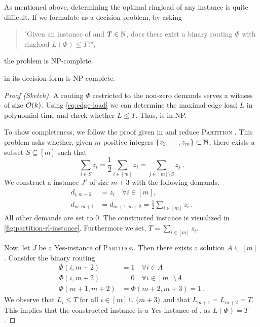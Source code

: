 As mentioned above, determining the optimal ringload of any \RL instance is quite difficult.
If we formulate \RL as a decision problem, by asking
\begin{quote}
	"Given an instance of \RL and $T \in \mathbb{N}$, does there exist a binary routing $\Phi$ with ringload $L(\Phi) \leq T$?",
\end{quote}
the problem is NP-complete.
\begin{theorem}
	\RL in its decision form is NP-complete.
\end{theorem}
\begin{proof}[Proof (Sketch)]
	A routing $\Phi$ restricted to the non-zero demands serves a witness of size $\mathcal{O}(k)$.
	Using \cref{eq:edge-load} we can determine the maximal edge load $L$ in polynomial time and check whether $L \leq T$.
	Thus, \RL is in NP.
	
	To show completeness, we follow the proof given in \cite{schrijver99} and reduce \textsc{Partition} \cite{karp72}.
	This problem asks whether, given $m$ positive integers $\{z_1, \ldots, z_m\} \subset \mathbb{N}$, there exists a subset $S \subseteq [m]$ such that 
	\begin{equation}
		\sum_{i \in S} z_i = \frac{1}{2}  \sum_{i \in [m]} z_i = \sum_{j \in [m] \setminus S} z_j\ .
	\end{equation}
	We construct a \RL instance $J'$ of size $m + 3$ with the following demands:
	\begin{align}
			d_{i, m+2} &= z_i \quad \forall i \in [m], \\
			d_{m, m+1} &= d_{m+1, m+2} = \frac{1}{2}  \sum_{i \in [m]} z_i \ . 
	\end{align}
	All other demands are set to $0$.
	The constructed instance is visualized in \cref{fig:partition-rl-instance}.
	Furthermore we set, $T = \sum_{i \in [m]} z_i$.
	
	Now, let $J$ be a Yes-instance of \textsc{Partition}.
	Then there exists a solution $A \subseteq [m]$.
	Consider the binary routing
	\begin{align}
		\Phi(i, m+2) &= 1 \quad \forall i \in A \\
		\Phi(i, m+2) &= 0 \quad \forall i \in [m] \setminus A \\
		\Phi(m+1, m+2) & = \Phi(m+2, m+3) = 1 \ .
	\end{align}
	We observe that $L_i \leq T$ for all $i \in [m] \cup \{m+3\}$ and that $L_{m+1} = L_{m+2} = T$.
	This implies that the constructed instance is a Yes-instance of \RL, as $L(\Phi) = T$.
	

\end{proof}
